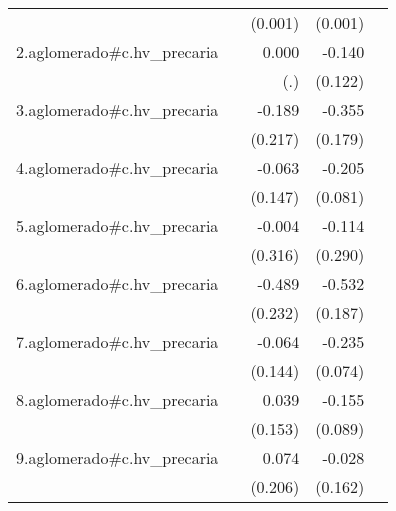 {\begin{longtable}{l*{4}{D{.}{.}{-1}}}
            &                     &     (0.001)         &     (0.001)         &                     \\
\addlinespace
2.aglomerado#c.hv\_precaria&                     &       0.000         &      -0.140         &                     \\
            &                     &         (.)         &     (0.122)         &                     \\
\addlinespace
3.aglomerado#c.hv\_precaria&                     &      -0.189         &      -0.355\sym{*}  &                     \\
            &                     &     (0.217)         &     (0.179)         &                     \\
\addlinespace
4.aglomerado#c.hv\_precaria&                     &      -0.063         &      -0.205\sym{*}  &                     \\
            &                     &     (0.147)         &     (0.081)         &                     \\
\addlinespace
5.aglomerado#c.hv\_precaria&                     &      -0.004         &      -0.114         &                     \\
            &                     &     (0.316)         &     (0.290)         &                     \\
\addlinespace
6.aglomerado#c.hv\_precaria&                     &      -0.489\sym{*}  &      -0.532\sym{**} &                     \\
            &                     &     (0.232)         &     (0.187)         &                     \\
\addlinespace
7.aglomerado#c.hv\_precaria&                     &      -0.064         &      -0.235\sym{**} &                     \\
            &                     &     (0.144)         &     (0.074)         &                     \\
\addlinespace
8.aglomerado#c.hv\_precaria&                     &       0.039         &      -0.155         &                     \\
            &                     &     (0.153)         &     (0.089)         &                     \\
\addlinespace
9.aglomerado#c.hv\_precaria&                     &       0.074         &      -0.028         &                     \\
            &                     &     (0.206)         &     (0.162)         &                     \\

\end{longtable}}
